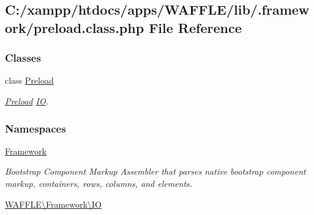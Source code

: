 \hypertarget{preload_8class_8php}{}\subsection{C\+:/xampp/htdocs/apps/\+W\+A\+F\+F\+L\+E/lib/.framework/preload.class.\+php File Reference}
\label{preload_8class_8php}
\subsubsection*{Classes}
\begin{DoxyCompactItemize}
\item 
class \hyperlink{class_w_a_f_f_l_e_1_1_framework_1_1_i_o_1_1_preload}{Preload}
\begin{DoxyCompactList}\small\item\em \hyperlink{class_w_a_f_f_l_e_1_1_framework_1_1_i_o_1_1_preload}{Preload} \hyperlink{namespace_w_a_f_f_l_e_1_1_framework_1_1_i_o}{IO}. \end{DoxyCompactList}\end{DoxyCompactItemize}
\subsubsection*{Namespaces}
\begin{DoxyCompactItemize}
\item 
 \hyperlink{namespace_framework}{Framework}
\begin{DoxyCompactList}\small\item\em Bootstrap Component Markup Assembler that parses native bootstrap component markup, containers, rows, columns, and elements. \end{DoxyCompactList}\item 
 \hyperlink{namespace_w_a_f_f_l_e_1_1_framework_1_1_i_o}{W\+A\+F\+F\+L\+E\textbackslash{}\+Framework\textbackslash{}\+IO}
\end{DoxyCompactItemize}

